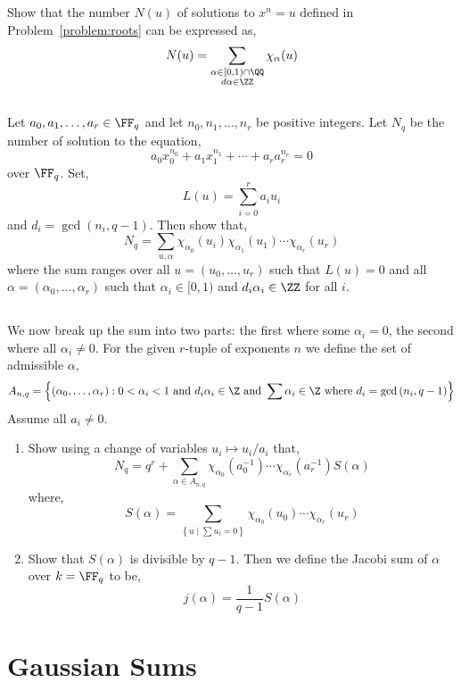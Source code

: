 \documentclass[12pt]{article}
\begin{document}
Show that the number $N(u)$ of solutions to $x^n = u$ defined in Problem~\ref{problem:roots} can be expressed as,
\[ N(u) = \sum_{\substack{ \alpha \in [0,1) \cap \QQ \\ 
d \alpha \in \ZZ }} \chi_{\alpha}(u) \]

\subsection{}

Let $a_0, a_1, \dots, a_r \in \FF_q$ and let $n_0, n_1, \dots, n_r$ be positive integers. Let $N_q$ be the number of solution to the equation,
\[ a_0 x_0^{n_0} + a_1 x_1^{n_1} + \cdots + a_r a_r^{n_r} = 0 \]
over $\FF_q$. Set,
\[ L(u) = \sum_{i = 0}^r a_i u_i \]
and $d_i = \gcd(n_i, q-1)$. Then show that,
\[ N_q = \sum_{u, \alpha} \chi_{\alpha_0}(u_i) \chi_{\alpha_1}(u_1) \cdots \chi_{\alpha_r}(u_r) \]
where the sum ranges over all $u = (u_0, \dots, u_r)$ such that $L(u) = 0$ and all $\alpha = (\alpha_0, \dots, \alpha_r)$ such that $\alpha_i \in [0,1)$ and $d_i \alpha_i \in \ZZ$ for all $i$.

\subsection{}

We now break up the sum into two parts: the first where some $\alpha_i = 0$, the second where all $\alpha_i \neq 0$. For the given $r$-tuple of exponents $n$ we define the set of admissible $\alpha$,
\[ A_{n, q} = \left\{ (\alpha_0, \dots, \alpha_r) : 0 < \alpha_i < 1 \text{ and } d_i \alpha_i \in \Z \text{ and } \sum \alpha_i \in \Z \text{ where } d_i = \gcd{(n_i, q-1)} \right\} \]
Assume all $a_i \neq 0$. 
\begin{enumerate}
\item Show using a change of variables $u_i \mapsto u_i / a_i$ that,
\[ N_q = q^r + \sum_{\alpha \in A_{n,q}} \chi_{\alpha_0}(a_0^{-1}) \cdots \chi_{\alpha_r}(a_r^{-1}) S(\alpha) \]
where,
\[ S(\alpha) = \sum_{\left\{ u \middle| \sum u_i = 0 \right\}} \chi_{\alpha_0}(u_0) \cdots \chi_{\alpha_r}(u_r) \]

\item Show that $S(\alpha)$ is divisible by $q-1$. Then we define the Jacobi sum of $\alpha$ over $k = \FF_q$ to be,
\[ j(\alpha) = \frac{1}{q-1} S(\alpha) \]
\end{enumerate}


\section{Gaussian Sums} 
\end{document}
